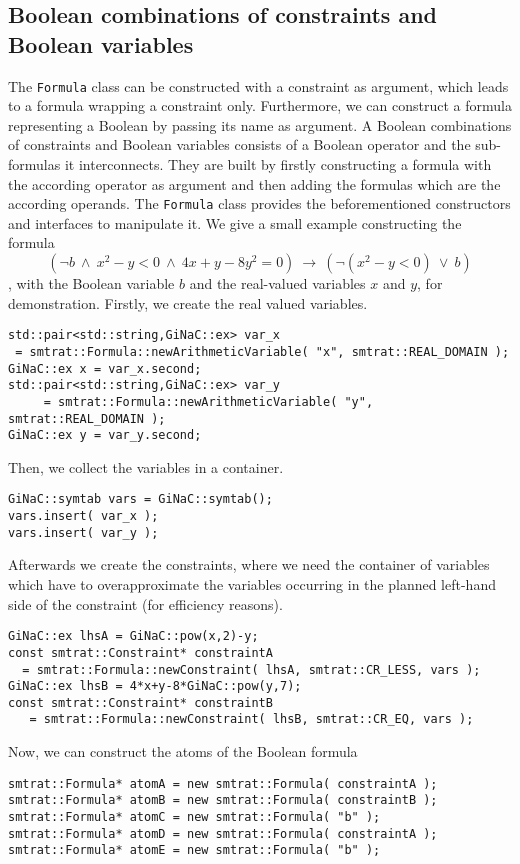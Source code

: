 \subsection{Boolean combinations of constraints and Boolean variables}
The \texttt{Formula} class can be constructed with a constraint as argument, which leads to a formula wrapping a constraint only. Furthermore, we can construct a formula representing a Boolean by passing its name as argument. A Boolean combinations of constraints and Boolean variables consists of a Boolean operator and the sub-formulas it interconnects. They are built by firstly constructing a formula with the according operator as argument and then adding the formulas which are the according operands. The \texttt{Formula} class provides the beforementioned constructors and interfaces to manipulate it. We give a small example constructing the formula \[(\neg b\ \land\ x^2-y<0\ \land\ 4x+y-8y^2=0 )\ \rightarrow\ (\neg(x^2-y<0)\ \lor\ b )\]
, with the Boolean variable $b$ and the real-valued variables $x$ and $y$, for demonstration. Firstly, we create the real valued variables.
\scriptsize
\begin{verbatim}
std::pair<std::string,GiNaC::ex> var_x 
 = smtrat::Formula::newArithmeticVariable( "x", smtrat::REAL_DOMAIN );
GiNaC::ex x = var_x.second;
std::pair<std::string,GiNaC::ex> var_y
     = smtrat::Formula::newArithmeticVariable( "y", smtrat::REAL_DOMAIN );
GiNaC::ex y = var_y.second;
\end{verbatim}
\normalsize
Then, we collect the variables in a container.
\scriptsize
\begin{verbatim}
GiNaC::symtab vars = GiNaC::symtab();
vars.insert( var_x );
vars.insert( var_y );
\end{verbatim}
\normalsize
Afterwards we create the constraints, where we need the container of variables which have to overapproximate the
variables occurring in the planned left-hand side of the constraint (for efficiency reasons).
\scriptsize
\begin{verbatim}
GiNaC::ex lhsA = GiNaC::pow(x,2)-y;
const smtrat::Constraint* constraintA 
  = smtrat::Formula::newConstraint( lhsA, smtrat::CR_LESS, vars );
GiNaC::ex lhsB = 4*x+y-8*GiNaC::pow(y,7);
const smtrat::Constraint* constraintB
   = smtrat::Formula::newConstraint( lhsB, smtrat::CR_EQ, vars );
\end{verbatim}
\normalsize
Now, we can construct the atoms of the Boolean formula
\scriptsize
\begin{verbatim}
smtrat::Formula* atomA = new smtrat::Formula( constraintA );
smtrat::Formula* atomB = new smtrat::Formula( constraintB );
smtrat::Formula* atomC = new smtrat::Formula( "b" );
smtrat::Formula* atomD = new smtrat::Formula( constraintA );
smtrat::Formula* atomE = new smtrat::Formula( "b" );
\end{verbatim}
